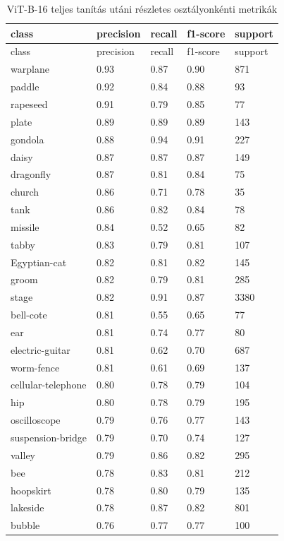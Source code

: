 \begin{center}
\begin{longtable}{lllll}
\caption{ViT-B-16 teljes tanítás utáni részletes osztályonkénti metrikák}\label{tab:phase2_ViT-B-16_class_table}\\
\toprule
class & precision & recall & f1-score & support \\
\midrule
\endfirsthead
\toprule
class & precision & recall & f1-score & support \\
\midrule
\endhead
warplane & 0.93 & 0.87 & 0.90 & 871 \\
paddle & 0.92 & 0.84 & 0.88 & 93 \\
rapeseed & 0.91 & 0.79 & 0.85 & 77 \\
plate & 0.89 & 0.89 & 0.89 & 143 \\
gondola & 0.88 & 0.94 & 0.91 & 227 \\
daisy & 0.87 & 0.87 & 0.87 & 149 \\
dragonfly & 0.87 & 0.81 & 0.84 & 75 \\
church & 0.86 & 0.71 & 0.78 & 35 \\
tank & 0.86 & 0.82 & 0.84 & 78 \\
missile & 0.84 & 0.52 & 0.65 & 82 \\
tabby & 0.83 & 0.79 & 0.81 & 107 \\
Egyptian-cat & 0.82 & 0.81 & 0.82 & 145 \\
groom & 0.82 & 0.79 & 0.81 & 285 \\
stage & 0.82 & 0.91 & 0.87 & 3380 \\
bell-cote & 0.81 & 0.55 & 0.65 & 77 \\
ear & 0.81 & 0.74 & 0.77 & 80 \\
electric-guitar & 0.81 & 0.62 & 0.70 & 687 \\
worm-fence & 0.81 & 0.61 & 0.69 & 137 \\
cellular-telephone & 0.80 & 0.78 & 0.79 & 104 \\
hip & 0.80 & 0.78 & 0.79 & 195 \\
oscilloscope & 0.79 & 0.76 & 0.77 & 143 \\
suspension-bridge & 0.79 & 0.70 & 0.74 & 127 \\
valley & 0.79 & 0.86 & 0.82 & 295 \\
bee & 0.78 & 0.83 & 0.81 & 212 \\
hoopskirt & 0.78 & 0.80 & 0.79 & 135 \\
lakeside & 0.78 & 0.87 & 0.82 & 801 \\
bubble & 0.76 & 0.77 & 0.77 & 100 \\

\end{longtable}
\end{center}
